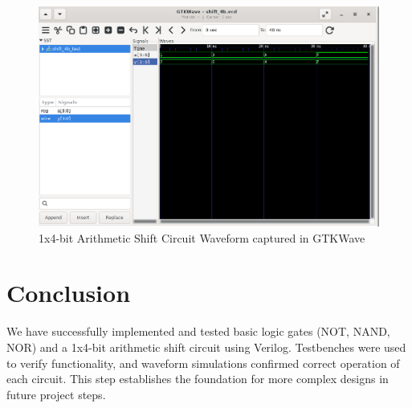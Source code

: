 \documentclass[12pt]{report}
\begin{document}
\begin{figure}[H]
    \centering
    \includegraphics[width=1.0\textwidth]{figs/SHIFT_WAVEFORM.png}
    \caption{1x4-bit Arithmetic Shift Circuit Waveform captured in GTKWave}
    \label{fig:shift_waveform}
\end{figure}

\chapter{Conclusion}

We have successfully implemented and tested basic logic gates (NOT, NAND, NOR) and a 1x4-bit arithmetic shift circuit using Verilog. Testbenches were used to verify functionality, and waveform simulations confirmed correct operation of each circuit. This step establishes the foundation for more complex designs in future project steps.
\end{document}
